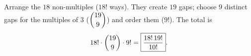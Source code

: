 Arrange the $18$ non-multiples ($18!$ ways). They create $19$ gaps; choose $9$ distinct gaps for the multiples of $3$ ($\dbinom{19}9$) and order them ($9!$). The total is
\[18!\cdot\dbinom{19}9\cdot9!=\boxed{\dfrac{18!\,19!}{10!}}.\]
